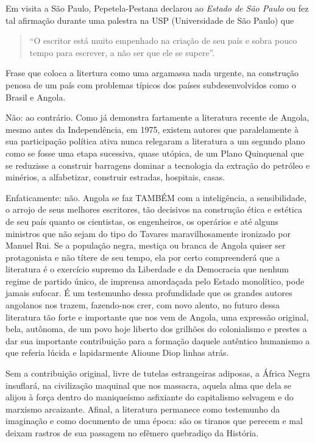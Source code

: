 \documentclass[
  letterpaper,
  DIV=11,
  numbers=noendperiod]{scrreprt}
\begin{document}
Em visita a São Paulo, Pepetela-Pestana declarou ao \emph{Estado de São
Paulo} ou fez tal afirmação durante uma palestra na USP (Universidade de
São Paulo) que

\begin{quote}
``O escritor está muito empenhado na criação de seu país e sobra pouco
tempo para escrever, a não ser que ele se supere''.
\end{quote}

Frase que coloca a litertura como uma argamassa nada urgente, na
construção penosa de um país com problemas típicos dos países
subdesenvolvidos como o Brasil e Angola.

Não: ao contrário. Como já demonstra fartamente a literatura recente de
Angola, mesmo antes da Independência, em 1975, existem autores que
paralelamente à sua participação política ativa nunca relegaram a
literatura a um segundo plano como se fosse uma etapa sucessiva, quase
utópica, de um Plano Quinquenal que se reduzisse a construir barragens
dominar a tecnologia da extração do petróleo e minérios, a alfabetizar,
construir estradas, hospitais, casas.

Enfaticamente: não. Angola se faz TAMBÉM com a inteligência, a
sensibilidade, o arrojo de seus melhores escritores, tão decisivos na
construção ética e estética de seu país quanto os cientistas, os
engenheiros, os operários e até alguns ministros que não sejam do tipo
do Tavares maravilhosamente ironizado por Manuel Rui. Se a população
negra, mestiça ou branca de Angola quiser ser protagonista e não títere
de seu tempo, ela por certo compreenderá que a literatura é o exercício
supremo da Liberdade e da Democracia que nenhum regime de partido único,
de imprensa amordaçada pelo Estado monolítico, pode jamais sufocar. É um
testemunho dessa profundidade que os grandes autores angolanos nos
trazem, fazendo-nos crer, com novo alento, no futuro dessa literatura
tão forte e importante que nos vem de Angola, uma expressão original,
bela, autônoma, de um povo hoje liberto dos grilhões do colonialismo e
prestes a dar sua importante contribuição para a formação daquele
autêntico humanismo a que referia lúcida e lapidarmente Alioune Diop
linhas atrás.

Sem a contribuição original, livre de tutelas estrangeiras adiposas, a
África Negra insuflará, na civilização maquinal que nos massacra, aquela
alma que dela se alijou à força dentro do maniqueísmo asfixiante do
capitalismo selvagem e do marxismo arcaizante. Afinal, a literatura
permanece como testemunho da imaginação e como documento de uma época:
são os tiranos que perecem e mal deixam rastros de sua passagem no
efêmero quebradiço da História.
\end{document}
